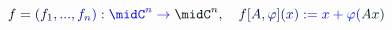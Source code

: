 \documentclass[12pt]{article}
\begin{document}
\makeatletter
\renewcommand*{\@textcolor}[3]{%
  \protect\leavevmode
  \begingroup
    \color#1{#2}#3%
  \endgroup
}
\makeatother
\begin{displaymath}
\mathcolor[RGB]{0,0,15}{f} \mathcolor[RGB]{0,0,30}{=} \mathcolor[RGB]{0,0,45}{(} \mathcolor[RGB]{0,0,60}{f} _ { \mathcolor[RGB]{0,0,75}{1} } \mathcolor[RGB]{0,0,90}{,} \mathcolor[RGB]{0,0,105}{.} \mathcolor[RGB]{0,0,120}{.} \mathcolor[RGB]{0,0,135}{.} \mathcolor[RGB]{0,0,150}{,} \mathcolor[RGB]{0,0,165}{f} _ { \mathcolor[RGB]{0,0,180}{n} } \mathcolor[RGB]{0,0,195}{)} \mathcolor[RGB]{0,0,210}{:} \mathcolor[RGB]{0,0,225}{\midC} ^ { \mathcolor[RGB]{0,0,240}{n} } \mathcolor[RGB]{0,0,255}{\rightarrow} \mathcolor[RGB]{0,15,0}{\midC} ^ { \mathcolor[RGB]{0,15,15}{n} } \mathcolor[RGB]{0,15,30}{,} \quad \mathcolor[RGB]{0,15,45}{f} \mathcolor[RGB]{0,15,60}{[} \mathcolor[RGB]{0,15,75}{A} \mathcolor[RGB]{0,15,90}{,} \mathcolor[RGB]{0,15,105}{\varphi} \mathcolor[RGB]{0,15,120}{]} \mathcolor[RGB]{0,15,135}{(} \mathcolor[RGB]{0,15,150}{x} \mathcolor[RGB]{0,15,165}{)} \mathcolor[RGB]{0,15,180}{:} \mathcolor[RGB]{0,15,195}{=} \mathcolor[RGB]{0,15,210}{x} \mathcolor[RGB]{0,15,225}{+} \mathcolor[RGB]{0,15,240}{\varphi} \mathcolor[RGB]{0,15,255}{(} \mathcolor[RGB]{0,30,0}{A} \mathcolor[RGB]{0,30,15}{x} \mathcolor[RGB]{0,30,30}{)}
\end{displaymath}
\end{document}
